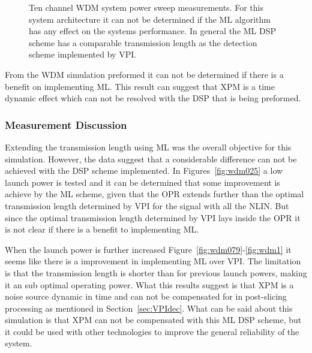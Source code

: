 \begin{figure}[h]
\centering
{}
\qquad
{}
\qquad
{}
\qquad
{}
\caption{Ten channel WDM system power sweep measurements. For this system architecture it can not be determined if the ML algorithm has any effect on the systems performance. In general the ML DSP scheme has a comparable transmission length as the detection scheme implemented by VPI.  }
\label{fig:powWDM}
\end{figure}

From the WDM simulation preformed it can not be determined if there is a benefit on implementing ML. This result can suggest that XPM is a time dynamic effect which can not be resolved with the DSP that is being preformed.


\subsubsection{Measurement Discussion}

Extending the transmission length using ML was the overall objective for this simulation. However, the data suggest that a considerable difference can not be achieved with the DSP scheme implemented. In Figures~\ref{fig:wdm025} a low launch power is tested and it can be determined that some improvement is achieve by the ML scheme, given that the OPR extends further than the optimal transmission length determined by VPI for the signal with all the NLIN. But since the optimal transmission length determined by VPI lays inside the OPR it is not clear if there is a benefit to implementing ML.

When the launch power is further increased Figure~\ref{fig:wdm079}-\ref{fig:wdm1} it seems like there is a improvement in implementing ML over VPI. The limitation is that the transmission length is shorter than for previous launch powers, making it an sub optimal operating power. What this results suggest is that XPM is a noise source dynamic in time and can not be compensated for in post-slicing processing as mentioned in Section~\ref{sec:VPIdec}. What can be said about this simulation is that XPM can not be compensated with this ML DSP scheme, but it could be used with other technologies to improve the general reliability of the system. 